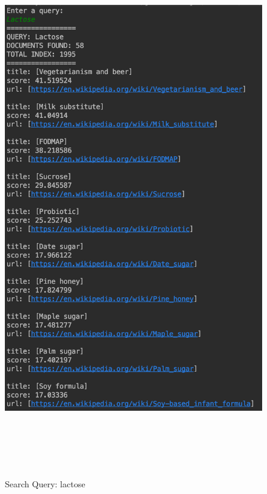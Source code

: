 \documentclass[a4paper]{article}
\begin{document}
\begin{figure}[H]
\begin{minipage}[b]{0.4\textwidth}
    \includegraphics[width=\textwidth]{imgs/lactose}
    \caption{Search Query: lactose}
    \label{fig:lactose}
  \end{minipage}
  \\\\\\\\
  \begin{minipage}[b]{0.4\textwidth}

\end{minipage}
\end{figure}
\end{document}

